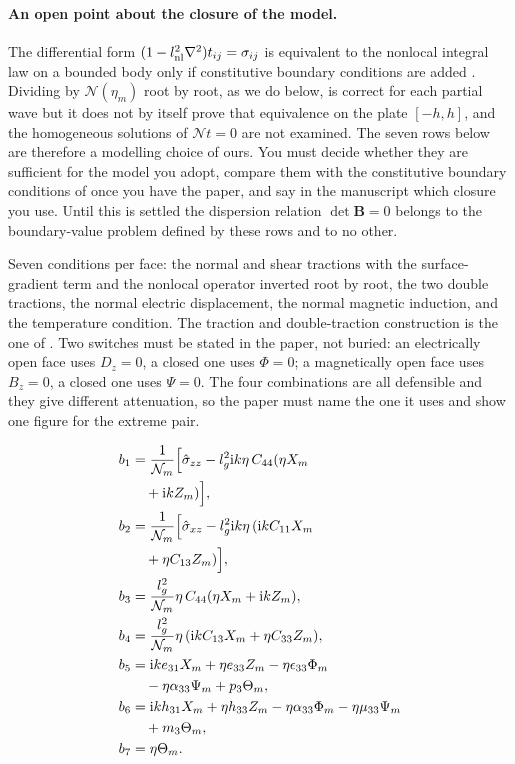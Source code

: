\documentclass[11pt]{article}
\makeatletter
\newif\ifshowworked
\newenvironment{worked}{%
  \ifshowworked\par\smallskip\noindent\textit{Working.}\par\smallskip\else
  \setbox\z@\vbox\bgroup\fi}{\ifshowworked\par\smallskip\else\egroup\fi}
\newcommand{\ii}{\mathrm{i}}
\newcommand{\Ncal}{\mathcal{N}}
\makeatother
\begin{document}
\paragraph{An open point about the closure of the model.} The differential form $(1-l_{\rm nl}^2\nabla^2)t_{ij}=\sigma_{ij}$ is equivalent to the nonlocal integral law on a bounded body only if constitutive boundary conditions are added \cite{Barretta2018}. Dividing by $\Ncal(\eta_m)$ root by root, as we do below, is correct for each partial wave but it does not by itself prove that equivalence on the plate $[-h,h]$, and the homogeneous solutions of $\Ncal t=0$ are not examined. The seven rows below are therefore a modelling choice of ours. You must decide whether they are sufficient for the model you adopt, compare them with the constitutive boundary conditions of \cite{Lim2015} once you have the paper, and say in the manuscript which closure you use. Until this is settled the dispersion relation $\det\mathbf B=0$ belongs to the boundary-value problem defined by these rows and to no other.

\begin{worked}
Seven conditions per face: the normal and shear tractions with the surface-gradient term and the nonlocal
operator inverted root by root, the two double tractions, the normal electric displacement, the normal
magnetic induction, and the temperature condition. The traction and double-traction construction is the
one of \cite[Sec.~2, Eq.~(14)]{Charal2019}.
Two switches must be stated in the paper, not buried: an electrically open face uses $D_z=0$, a closed one
uses $\Phi=0$; a magnetically open face uses $B_z=0$, a closed one uses $\Psi=0$. The four combinations are
all defensible and they give different attenuation, so the paper must name the one it uses and show one
figure for the extreme pair.
\end{worked}

\begin{align}
b_1&=\frac{1}{\Ncal_m}\Bigl[\hat\sigma_{zz}-l_g^2\ii k\eta\,C_{44}(\eta X_m \nonumber\\
&\quad +\ii kZ_m)\Bigr], \\
b_2&=\frac{1}{\Ncal_m}\Bigl[\hat\sigma_{xz}-l_g^2\ii k\eta\,(\ii kC_{11}X_m \nonumber\\
&\quad +\eta C_{13}Z_m)\Bigr], \\
b_3&=\frac{l_g^2}{\Ncal_m}\eta\,C_{44}(\eta X_m+\ii kZ_m), \\
b_4&=\frac{l_g^2}{\Ncal_m}\eta\,(\ii kC_{13}X_m+\eta C_{33}Z_m), \\
b_5&=\ii ke_{31}X_m+\eta e_{33}Z_m-\eta\epsilon_{33}\Phi_m \nonumber\\
&\quad -\eta\alpha_{33}\Psi_m+p_3\Theta_m, \\
b_6&=\ii kh_{31}X_m+\eta h_{33}Z_m-\eta\alpha_{33}\Phi_m-\eta\mu_{33}\Psi_m \nonumber\\
&\quad +m_3\Theta_m, \\
b_7&=\eta\Theta_m .
\end{align}
\end{document}
